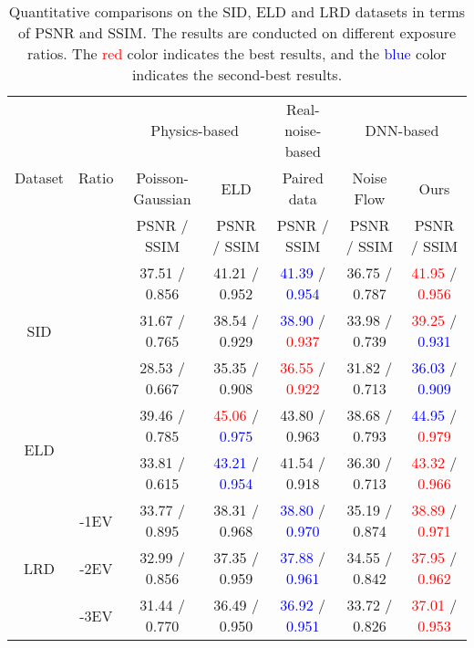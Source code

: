 \documentclass[10pt,twocolumn,letterpaper]{article}
\begin{document}
\begin{table*}[!t]
\centering
\caption{Quantitative comparisons on the SID, ELD and LRD datasets in terms of PSNR and SSIM. The results are conducted on different exposure ratios. The \textcolor{red}{red} color indicates the best results, and the \textcolor{blue}{blue} color indicates the second-best results.}
\vspace{2pt}
\begin{tabular}{ccccccc}
\toprule[1.5pt]
\multirow{3}{*}{Dataset} & \multirow{3}{*}{Ratio} & \multicolumn{2}{c}{Physics-based}                 & \multicolumn{1}{c}{Real-noise-based} & \multicolumn{2}{c}{DNN-based}   \\ \cline{3-7} 
&  & \multicolumn{1}{c}{Poisson-Gaussian} & \multicolumn{1}{c}{ELD} & \multicolumn{1}{c}{Paired data} & \multicolumn{1}{c}{Noise Flow} & \multicolumn{1}{c}{Ours} \\ \cline{3-7} 
&  & PSNR / SSIM & PSNR / SSIM &PSNR / SSIM  & PSNR / SSIM & PSNR / SSIM\\\hline
\multirow{3}{*}{SID}&  &37.51 / 0.856 &41.21 / 0.952 &\textcolor{blue}{41.39} / \textcolor{blue}{0.954} &36.75 / 0.787 &\textcolor{red}{41.95} / \textcolor{red}{0.956}\\
&  &31.67 / 0.765 &38.54 / 0.929 &\textcolor{blue}{38.90} / \textcolor{red}{0.937} &33.98 / 0.739 & \textcolor{red}{39.25} / \textcolor{blue}{0.931}\\
&  &28.53 / 0.667 &35.35 / 0.908 &\textcolor{red}{36.55} / \textcolor{red}{0.922} &31.82 / 0.713 &\textcolor{blue}{36.03} / \textcolor{blue}{0.909}\\ \hline
\multirow{2}{*}{ELD} & &39.46 / 0.785 &\textcolor{red}{45.06} / \textcolor{blue}{0.975} &43.80 / 0.963 &38.68 / 0.793 &\textcolor{blue}{44.95} / \textcolor{red}{0.979} \\
&  &33.81 / 0.615 &\textcolor{blue}{43.21} / \textcolor{blue}{0.954} &41.54 / 0.918 &36.30 / 0.713 &\textcolor{red}{43.32} / \textcolor{red}{0.966}\\ \hline
\multirow{3}{*}{LRD}& -1EV &33.77 / 0.895 &38.31 / 0.968 &\textcolor{blue}{38.80} / \textcolor{blue}{0.970} & 35.19 / 0.874 & \textcolor{red}{38.89} / \textcolor{red}{0.971} \\
& -2EV &32.99 / 0.856 &37.35 / 0.959 &\textcolor{blue}{37.88} / \textcolor{blue}{0.961} &34.55 / 0.842 &  \textcolor{red}{37.95} / \textcolor{red}{0.962} \\
& -3EV &31.44 / 0.770 &36.49 / 0.950 &\textcolor{blue}{36.92} / \textcolor{blue}{0.951} &33.72 / 0.826 & \textcolor{red}{37.01} / \textcolor{red}{0.953} \\
\bottomrule[1.5pt]
\end{tabular}
\label{table:psnr}
\vspace{-2ex}
\end{table*}
\end{document}
